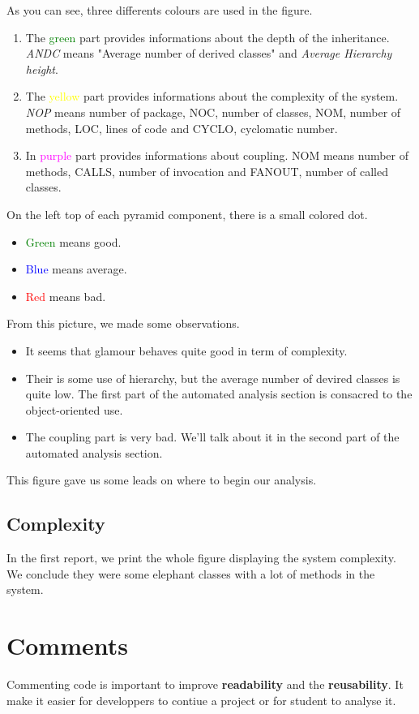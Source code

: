 \documentclass[11pt,a4paper]{article}
\begin{document}
As you can see, three differents colours are used in the figure.
\begin{enumerate}
\item The \textcolor{green}{green} part provides informations about the depth of the inheritance. \textit{ANDC} means "Average number of derived classes" and \textit{Average Hierarchy height}.  
\item The \textcolor{yellow}{yellow} part provides informations about the complexity of the system. \textit{NOP} means number of package, NOC, number of classes, NOM, number of methods, LOC, lines of code and CYCLO, cyclomatic number.
\item In \textcolor{magenta}{purple} part provides informations about coupling. NOM means number of methods, CALLS, number of invocation and FANOUT, number of called classes.
\end{enumerate}

On the left top of each pyramid component, there is a small colored dot.
\begin{itemize}
\item \textcolor{green}{Green} means good.
\item \textcolor{blue}{Blue} means average.
\item \textcolor{red}{Red} means bad.
\end{itemize}

From this picture, we made some observations. 
\begin{itemize}
\item It seems that glamour behaves quite good in term of complexity.
\item Their is some use of hierarchy, but the average number of devired classes is quite low. The first part of the automated analysis section is consacred to the object-oriented use. 
\item The coupling part is very bad. We'll talk about it in the second part of the automated analysis section. 
\end{itemize}

This figure gave us some leads on where to begin our analysis. 
\subsection{Complexity}
In the first report, we print the whole figure displaying the system complexity. We conclude they were some elephant classes with a lot of methods in the system.  
\section{Comments}
Commenting code is important to improve \textbf{readability} and  the \textbf{reusability}. It make it easier for developpers to contiue a project or for student to analyse it.\\
\end{document}
